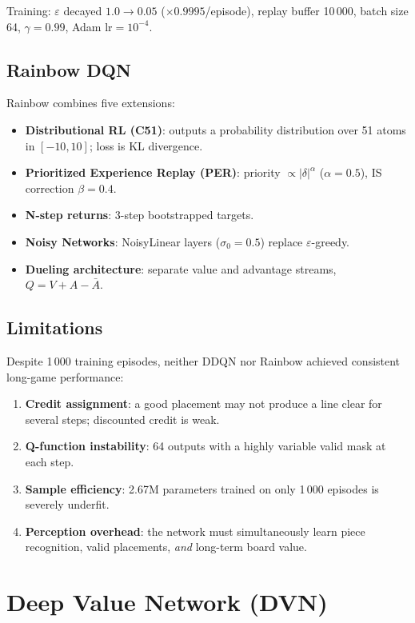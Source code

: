 \documentclass[10pt]{article}
\begin{document}
Training: $\varepsilon$ decayed $1.0\to0.05$ ($\times0.9995$/episode), replay buffer 10\,000, batch size 64, $\gamma=0.99$, Adam $\text{lr}=10^{-4}$.

\subsection{Rainbow DQN}

Rainbow combines five extensions:
\begin{itemize}
    \item \textbf{Distributional RL (C51)}: outputs a probability distribution over 51 atoms in $[{-10}, 10]$; loss is KL divergence.
    \item \textbf{Prioritized Experience Replay (PER)}: priority $\propto |\delta|^\alpha$ ($\alpha=0.5$), IS correction $\beta=0.4$.
    \item \textbf{N-step returns}: 3-step bootstrapped targets.
    \item \textbf{Noisy Networks}: NoisyLinear layers ($\sigma_0=0.5$) replace $\varepsilon$-greedy.
    \item \textbf{Dueling architecture}: separate value and advantage streams, $Q = V + A - \bar{A}$.
\end{itemize}

\subsection{Limitations}

Despite 1\,000 training episodes, neither DDQN nor Rainbow achieved consistent long-game performance:
\begin{enumerate}
    \item \textbf{Credit assignment}: a good placement may not produce a line clear for several steps; discounted credit is weak.
    \item \textbf{Q-function instability}: 64 outputs with a highly variable valid mask at each step.
    \item \textbf{Sample efficiency}: 2.67M parameters trained on only 1\,000 episodes is severely underfit.
    \item \textbf{Perception overhead}: the network must simultaneously learn piece recognition, valid placements, \emph{and} long-term board value.
\end{enumerate}

\newpage
\section{Deep Value Network (DVN)}
\label{sec:dvn}
\end{document}
